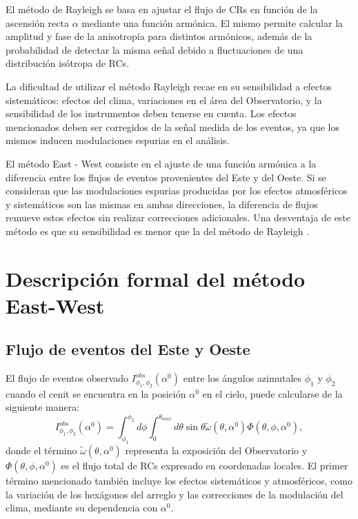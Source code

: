 

El método de Rayleigh se basa en ajustar el flujo de CRs en función de la ascensión recta $\alpha$ mediante una función armónica. El mismo permite calcular la amplitud y fase de la anisotropía para distintos armónicos, además de la probabilidad de detectar la misma señal debido a fluctuaciones de una distribución isótropa de RCs. 

La dificultad de utilizar el método Rayleigh recae en su sensibilidad a efectos sistemáticos: efectos del clima, variaciones en el área del Observatorio, y la sensibilidad de los instrumentos deben tenerse en cuenta.  Los efectos mencionados deben ser corregidos de la señal medida de los eventos, ya que los mismos inducen modulaciones espurias en el análisis.

El método East - West consiste en el ajuste de una función armónica a la diferencia entre los flujos de eventos provenientes del Este y del Oeste. Si se consideran que las modulaciones espurias producidas por los efectos atmosféricos y sistemáticos son las mismas en ambas direcciones, la diferencia de flujos remueve estos efectos sin realizar correcciones adicionales. Una desventaja de este método es que su sensibilidad es menor que la del método de Rayleigh \cite{taborda}.


\section{Descripción formal del método East-West}
 

    \subsection{Flujo de eventos del Este y Oeste}
    El flujo de eventos observado $I_{\phi_1, \phi_2}^{obs}(\alpha^0)$  entre los ángulos azimutales $\phi_1$ y $\phi_2$ cuando el cenit se encuentra en la posición  $\alpha^0$ en el cielo,  puede calcularse  de la siguiente manera:
    \begin{equation}
        I_{\phi_1, \phi_2}^{obs}(\alpha^0) = \int_{\phi_1}^{\phi_2} d\phi \int_{0}^{\theta_{max}} d\theta \sin\theta \tilde{\omega}(\theta, \alpha^0) \Phi(\theta, \phi, \alpha^0),
        \label{eq:rate_general}
    \end{equation}
    \noindent  donde  el término $\tilde{\omega}(\theta, \alpha^0)$ representa la exposición del Observatorio y $\Phi(\theta, \phi, \alpha^0)$ es el flujo total de RCs expresado en coordenadas locales. El primer término mencionado también incluye los efectos sistemáticos y atmosféricos, como la variación de los hexágonos del arreglo y las correcciones de la modulación del clima, mediante  su dependencia con $\alpha^0$.

